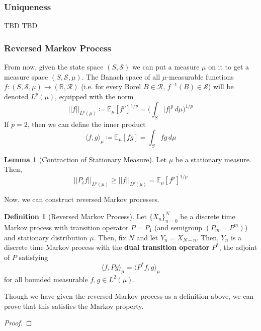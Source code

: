 \documentclass{article}
\theoremstyle{definition}
\newtheorem{lemma}[theorem]{Lemma}
\theoremstyle{remark}
\theoremstyle{definition}
\newtheorem{definition}{Definition}[section]
\begin{document}
    \subsubsection{Uniqueness}

      TBD
      TBD

    \subsubsection{Reversed Markov Process}

      From now, given the state space $(S, \mathcal{S})$ we can put a measure $\mu$ on it to get a measure space $(S, \mathcal{S}, \mu)$. The Banach space of all $\mu$-measurable functions $f: (S, \mathcal{S}, \mu) \rightarrow (\mathbb{R}, \mathcal{R})$ (i.e. for every Borel $B \in \mathcal{R}$, $f^{-1}(B) \in \mathcal{S}$) will be denoted $L^p (\mu)$, equipped with the norm 
      \[||f||_{L^p(\mu)} \coloneqq \mathbb{E}_\mu [f^p]^{1/p} = \bigg( \int_S |f|^p \,d\mu \bigg)^{1/p}\]
      If $p = 2$, then we can define the inner product 
      \[\langle f, g \rangle_\mu \coloneqq \mathbb{E}_\mu [f g] = \int_S f g \, d\mu\]

      \begin{lemma}[Contraction of Stationary Measure]
      Let $\mu$ be a stationary measure. Then, 
      \[||P_t f||_{L^p(\mu)} \geq ||f||_{L^p (\mu)} = \mathbb{E}_\mu [f^p]^{1/p}\]
      \end{lemma}

      Now, we can construct reversed Markov processes. 

      \begin{definition}[Reversed Markov Process]
      Let $\{X_n\}_{n=0}^N$ be a discrete time Markov process with transition operator $P = P_1$ (and semigroup $(P_m = P^m)$) and stationary distribution $\mu$. Then, fix $N$ and let $Y_n = X_{N - n}$. Then, $Y_n$ is a discrete time Markov process with the \textbf{dual transition operator} $P^*$, the adjoint of $P$ satisfying 
      \[\langle f, P g \rangle_\mu = \langle P^* f, g \rangle_\mu\]
      for all bounded measurable $f, g \in L^2 (\mu)$. 
      \end{definition}

      Though we have given the reversed Markov process as a definition above, we can prove that this satisfies the Markov property. 

      \begin{proof}

      \end{proof}
\end{document}
